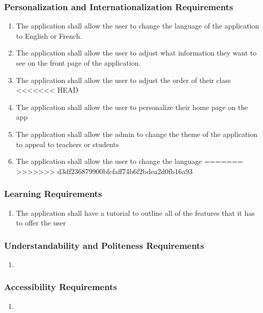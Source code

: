 \documentclass[]{article}
\begin{document}
\subsubsection{Personalization and Internationalization Requirements}
\label{ssub:personalization_and_internationalization_requirements}
\begin{enumerate}[{UH}1. ]
	\item The application shall allow the user to change the language of the
application to English or French.
	\item The application shall allow the user to adjust what information they want
to see on
the front page of the application.
	\item The application shall allow the user to adjust the order of their class
<<<<<<< HEAD
	\item The application shall allow the user to personalize their home page on the app
	\item The application shall allow the admin to change the theme of the application to appeal to teachers or students
	\item The application shall allow the user to change the language
=======
>>>>>>> d3df236879900bfcfaff74b6f2bdea2d0fb16a93
\end{enumerate}

\subsubsection{Learning Requirements}
\label{ssub:learning_requirements}
\begin{enumerate}[{UH}1. ]
		\item The application shall have a tutorial to outline all of the features
that it has to offer the user
\end{enumerate}

\subsubsection{Understandability and Politeness Requirements}
\label{ssub:understandability_and_politeness_requirements}
\begin{enumerate}[{UH}1. ]
	\item
\end{enumerate}

\subsubsection{Accessibility Requirements}
\label{ssub:accessibility_requirements}
\begin{enumerate}[{UH}1. ]
	\item
\end{enumerate}
\end{document}
